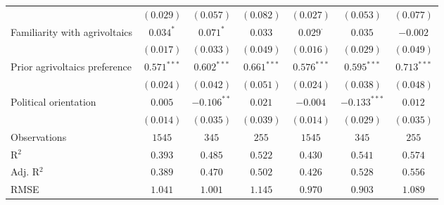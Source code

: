 \begin{center}
\begin{small}
\begin{longtable}{l@{} c@{} c@{} c@{} c@{} c@{} c@{}}
                                    & $(0.029)$        & $(0.057)$     & $(0.082)$     & $(0.027)$       & $(0.053)$      & $(0.077)$     \\
\quad Familiarity with agrivoltaics & $0.034^{*}$      & $0.071^{*}$   & $0.033$       & $0.029^{\cdot}$ & $0.035$        & $-0.002$      \\
                                    & $(0.017)$        & $(0.033)$     & $(0.049)$     & $(0.016)$       & $(0.029)$      & $(0.049)$     \\
\quad Prior agrivoltaics preference & $0.571^{***}$    & $0.602^{***}$ & $0.661^{***}$ & $0.576^{***}$   & $0.595^{***}$  & $0.713^{***}$ \\
                                    & $(0.024)$        & $(0.042)$     & $(0.051)$     & $(0.024)$       & $(0.038)$      & $(0.048)$     \\
\quad Political orientation         & $0.005$          & $-0.106^{**}$ & $0.021$       & $-0.004$        & $-0.133^{***}$ & $0.012$       \\
                                    & $(0.014)$        & $(0.035)$     & $(0.039)$     & $(0.014)$       & $(0.029)$      & $(0.035)$     \\
\hline
Observations                        & $1545$           & $345$         & $255$         & $1545$          & $345$          & $255$         \\
R$^2$                               & $0.393$          & $0.485$       & $0.522$       & $0.430$         & $0.541$        & $0.574$       \\
Adj. R$^2$                          & $0.389$          & $0.470$       & $0.502$       & $0.426$         & $0.528$        & $0.556$       \\
RMSE                                & $1.041$          & $1.001$       & $1.145$       & $0.970$         & $0.903$        & $1.089$       \\
\end{longtable}
\end{small}
\end{center}
